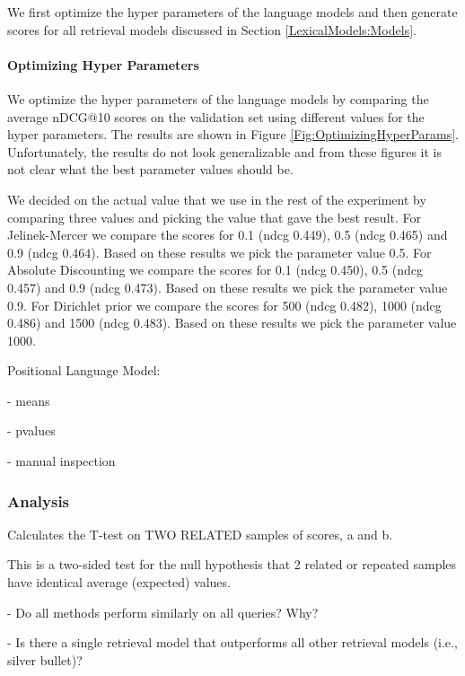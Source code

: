 We first optimize the hyper parameters of the 
language models and then generate scores for
all retrieval models discussed in 
Section \ref{LexicalModels:Models}.

\paragraph{Optimizing Hyper Parameters}

We optimize the hyper parameters of the language models
by comparing the average nDCG@10 scores on the validation set 
using different values for the hyper parameters.
The results are shown in Figure \ref{Fig:OptimizingHyperParams}.
Unfortunately, the results do not look generalizable and 
from these figures it is not clear what 
the best parameter values should be. 



We decided on the actual value that we use in the rest of the experiment
by comparing three values and picking the value that gave the best result.
%
For Jelinek-Mercer we compare the scores for 0.1 (ndcg 0.449),
0.5 (ndcg 0.465) and 0.9 (ndcg 0.464). Based on these results we pick
the parameter value 0.5. 
%
For Absolute Discounting we compare the scores for 0.1 (ndcg 0.450),
0.5 (ndcg 0.457) and 0.9 (ndcg 0.473). Based on these results we pick
the parameter value 0.9. 
%
For Dirichlet prior we compare the scores for 500 (ndcg 0.482),
1000 (ndcg 0.486) and 1500 (ndcg 0.483). Based on these results we pick
the parameter value 1000. 




Positional Language Model:




- means



- pvalues

- manual inspection

\subsubsection{Analysis}
\label{AnalysisLexicalModels}

Calculates the T-test on TWO RELATED samples of scores, a and b.

This is a two-sided test for the null hypothesis that 2 related or repeated samples have identical average (expected) values.



- Do all methods perform similarly on all queries? Why?

- Is there a single retrieval model that outperforms all other retrieval models (i.e., silver bullet)?